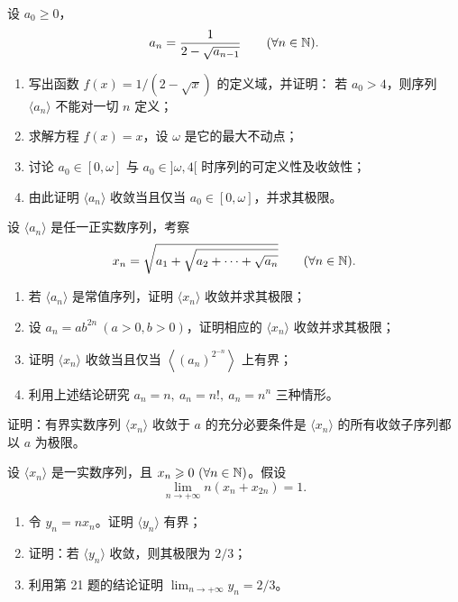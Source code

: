 \begin{exercise}
\item 设 \(a_0\geqslant0\)，
\[
a_n=\frac1{2-\sqrt{a_{n-1}}}\qquad(\forall n\in\mathbb{N}).
\]
\begin{enumerate}[label=\arabic*)]
  \item 写出函数 \(f(x)=1/(2-\sqrt{x})\) 的定义域，并证明：
  若 \(a_0>4\)，则序列 \(\langle a_n\rangle\) 不能对一切 \(n\) 定义；
  \item 求解方程 \(f(x)=x\)，设 \(\omega\) 是它的最大不动点；
  \item 讨论 \(a_0\in[0,\omega]\) 与 \(a_0\in]\omega,4[\) 时序列的可定义性及收敛性；
  \item 由此证明 \(\langle a_n\rangle\) 收敛当且仅当
  \(a_0\in[0,\omega]\)，并求其极限。
\end{enumerate}
\end{exercise}

\begin{exercise}
\item 设 \(\langle a_n\rangle\) 是任一正实数序列，考察
\[
x_n=\sqrt{a_1+\sqrt{a_2+\cdots+\sqrt{a_n}}}\qquad(\forall n\in\mathbb{N}).
\]
\begin{enumerate}[label=\arabic*)]
  \item 若 \(\langle a_n\rangle\) 是常值序列，证明
  \(\langle x_n\rangle\) 收敛并求其极限；
  \item 设 \(a_n=ab^{2n}\ (a>0,b>0)\)，证明相应的
  \(\langle x_n\rangle\) 收敛并求其极限；
  \item 证明 \(\langle x_n\rangle\) 收敛当且仅当
  \(\left\langle(a_n)^{2^{-n}}\right\rangle\) 上有界；
  \item 利用上述结论研究 \(a_n=n,\ a_n=n!,\ a_n=n^n\) 三种情形。
\end{enumerate}
\end{exercise}

\begin{exercise}
\item 证明：有界实数序列 \(\langle x_n\rangle\) 收敛于 \(a\) 的充分必要条件是
\(\langle x_n\rangle\) 的所有收敛子序列都以 \(a\) 为极限。
\end{exercise}

\begin{exercise}
\item 设 \(\langle x_n\rangle\) 是一实数序列，且
\(x_n\geqslant0\ (\forall n\in\mathbb{N})\)。假设
\[
\lim_{n\to+\infty}n(x_n+x_{2n})=1.
\]
\begin{enumerate}[label=\arabic*)]
  \item 令 \(y_n=nx_n\)。证明 \(\langle y_n\rangle\) 有界；
  \item 证明：若 \(\langle y_n\rangle\) 收敛，则其极限为 \(2/3\)；
  \item 利用第 21 题的结论证明 \(\lim_{n\to+\infty}y_n=2/3\)。
\end{enumerate}
\end{exercise}

